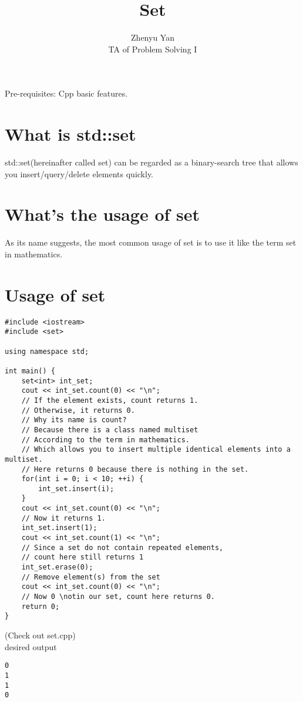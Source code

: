 \documentclass{article}
\title{Set}
\author{Zhenyu Yan\\TA of Problem Solving I}
\date{}
\begin{document}
\maketitle
Pre-requisites: Cpp basic features.
\section{What is std::set}
std::set(hereinafter called set) can be regarded as a binary-search tree that allows you insert/query/delete elements quickly.\\
\section{What's the usage of set}
As its name suggests, the most common usage of set is to use it like the term set in mathematics.\\
\newpage
\section{Usage of set}
\begin{lstlisting}
#include <iostream>
#include <set>

using namespace std;

int main() {
    set<int> int_set;
    cout << int_set.count(0) << "\n";
    // If the element exists, count returns 1.
    // Otherwise, it returns 0.
    // Why its name is count?
    // Because there is a class named multiset
    // According to the term in mathematics.
    // Which allows you to insert multiple identical elements into a multiset.
    // Here returns 0 because there is nothing in the set.
    for(int i = 0; i < 10; ++i) {
        int_set.insert(i);
    }
    cout << int_set.count(0) << "\n";
    // Now it returns 1.
    int_set.insert(1);
    cout << int_set.count(1) << "\n";
    // Since a set do not contain repeated elements,
    // count here still returns 1
    int_set.erase(0);
    // Remove element(s) from the set
    cout << int_set.count(0) << "\n";
    // Now 0 \notin our set, count here returns 0.
    return 0;
}
\end{lstlisting}
(Check out set.cpp)\\
desired output
\begin{lstlisting}
0
1
1
0
\end{lstlisting}
\end{document}
